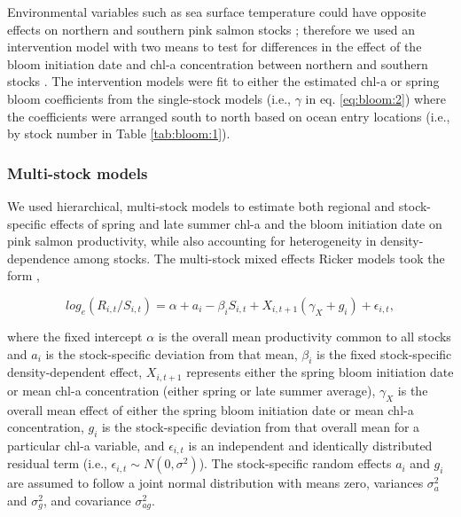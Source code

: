 Environmental variables such as sea surface temperature could have opposite
effects on northern and southern pink salmon stocks \citep{Mueter2002a,
Su2004a}; therefore we used an intervention model with two means
\citep{Chatfield2004, Mueter2002a} to test for differences in the effect of the
bloom initiation date and chl-a concentration between northern and southern
stocks \citep{Chatfield2004, Mueter2002a}. The intervention models were fit to
either the estimated chl-a or spring bloom coefficients from the single-stock
models (i.e., \(\gamma\) in eq. \ref{eq:bloom:2}) where the coefficients were
arranged south to north based on ocean entry locations (i.e., by stock number in
Table \ref{tab:bloom:1}).


\subsubsection{Multi-stock models}

We used hierarchical, multi-stock models to estimate both regional and
stock-specific effects of spring and late summer chl-a and the bloom initiation
date on pink salmon productivity, while also accounting for heterogeneity in
density-dependence among stocks. The multi-stock mixed effects Ricker models
took the form \citep{Myers1999a, Mueter2002a},

\begin{equation}
log_e(R_{i,t}/S_{i,t}) = \alpha + a_i - \beta_iS_{i,t} + 
X_{i,t+1} (\gamma_{X} + g_{i}) + \epsilon_{i,t}, \label{eq:bloom:3}
\end{equation}

\noindent
where the fixed intercept \(\alpha\) is the overall mean productivity common to
all stocks and \(a_i\) is the stock-specific deviation from that mean,
\(\beta_i\) is the fixed stock-specific density-dependent effect, \(X_{i,t+1}\)
represents either the spring bloom initiation date or mean chl-a concentration
(either spring or late summer average), \(\gamma_X\) is the overall mean effect
of either the spring bloom initiation date or mean chl-a concentration, \(g_i\)
is the stock-specific deviation from that overall mean for a particular chl-a
variable, and \(\epsilon_{i,t}\) is an independent and identically distributed
residual term (i.e., \(\epsilon_{i,t} \sim N(0,\sigma^2)\)).  The stock-specific
random effects \(a_i\) and \(g_i\) are assumed to follow a joint normal
distribution with means zero, variances \(\sigma^2_a\) and \(\sigma^2_g\), and
covariance \(\sigma^2_{ag}\).

